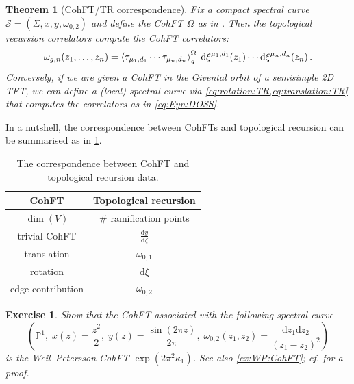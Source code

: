 \documentclass[11pt,reqno]{amsart}
\numberwithin{equation}{section}
\newcommand{\dd}{\mathrm{d}}
\newcommand{\mb}[1]{\mathbb{#1}}
\newcommand{\mc}[1]{\mathcal{#1}}
\renewcommand{\P}{\mb{P}}
\theoremstyle{plain}
\newtheorem{theorem}{Theorem}[section]
\newtheorem{exercise}{Exercise}[section]
\theoremstyle{definition}
\begin{document}
\begin{theorem}[{CohFT/TR correspondence}] \label{thm:Eyn:DOSS}
  Fix a compact spectral curve $\mc{S} = (\Sigma,x,y,\omega_{0,2})$ and define the CohFT $\Omega$ as in . Then the topological recursion correlators compute the CohFT correlators:
  \begin{equation}\label{eq:Eyn:DOSS}
    \omega_{g,n}(z_1,\dots,z_n)
    =
    \Braket{\tau_{\mu_1,d_1} \cdots \tau_{\mu_n,d_n}}^{\Omega}_g \;
    \dd\xi^{\mu_1,d_1}(z_1) \cdots \dd\xi^{\mu_n,d_n}(z_n) \,.
  \end{equation}
  Conversely, if we are given a CohFT in the Givental orbit of a semisimple 2D TFT, we can define a (local) spectral curve via \cref{eq:rotation:TR,eq:translation:TR} that computes the correlators as in \cref{eq:Eyn:DOSS}.
\end{theorem}

In a nutshell, the correspondence between CohFTs and topological recursion can be summarised as in \cref{tbl:CohFT:TR}.

\begin{table}
  \centering
  \begin{tabular}{c|c}
    \toprule
      CohFT & Topological recursion \\
    \midrule
      $\dim(V)$ & \# ramification points \\[.5ex]
      trivial CohFT & $\frac{\dd y}{\dd\zeta}$ \\[.5ex]
      translation & $\omega_{0,1}$ \\[.5ex]
      rotation & $\dd \xi$ \\[.5ex]
      edge contribution & $\omega_{0,2}$ \\
    \bottomrule
  \end{tabular}
  \caption{The correspondence between CohFT and topological recursion data.}
  \label{tbl:CohFT:TR}
\end{table}

\begin{exercise}\label{ex:TR:CohFT:WP}
  Show that the CohFT associated with the following spectral curve
  \begin{equation}
    \left(
      \P^1, \;
      x(z) = \frac{z^2}{2},\;
      y(z) = \frac{\sin(2\pi z)}{2\pi}, \;
      \omega_{0,2}(z_1,z_2) = \frac{\dd z_1 \dd z_2}{(z_1 - z_2)^2}
    \right)
  \end{equation}
  is the Weil--Petersson CohFT $\exp(2\pi^2 \kappa_1)$. See also \cref{ex:WP:CohFT}; cf. \cite[section 8.1]{Eyn} for a proof.
\end{exercise}
\end{document}
